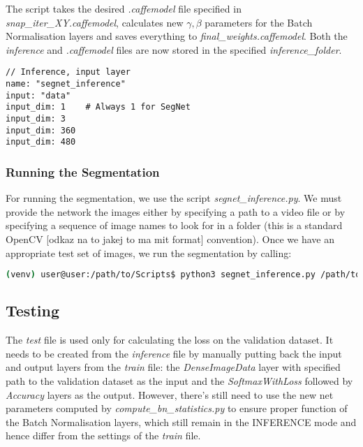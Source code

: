 The script takes the desired \textit{.caffemodel} file specified in \textit{snap\_iter\_XY.caffemodel}, calculates new $ \gamma, \beta $ parameters for the Batch Normalisation layers and saves everything to \textit{final\_weights.caffemodel}. Both the \textit{inference} and \textit{.caffemodel} files are now stored in the specified \textit{inference\_folder}.

\begin{lstlisting}
// Inference, input layer
name: "segnet_inference"
input: "data"
input_dim: 1	# Always 1 for SegNet
input_dim: 3
input_dim: 360
input_dim: 480
\end{lstlisting}

\subsubsection{Running the Segmentation}

For running the segmentation, we use the script \textit{segnet\_inference.py}. We must provide the network the images either by specifying a path to a video file or by specifying a sequence of image names to look for in a folder (this is a standard OpenCV [odkaz na to jakej to ma mit format] convention). Once we have an appropriate test set of images, we run the segmentation by calling:

\begin{lstlisting}[language=bash]
(venv) user@user:/path/to/Scripts$ python3 segnet_inference.py /path/to/inference.prototxt /path/to/final_weights.caffemodel /path/to/videofile.avi 
\end{lstlisting}

\subsection{Testing}

The \textit{test} file is used only for calculating the loss on the validation dataset. It needs to be created from the \textit{inference} file by manually putting back the input and output layers from the \textit{train} file: the \textit{DenseImageData} layer with specified path to the validation dataset as the input and the \textit{SoftmaxWithLoss} followed by \textit{Accuracy} layers as the output. However, there's still need to use the new net parameters computed by \textit{compute\_bn\_statistics.py} to ensure proper function of the Batch Normalisation layers, which still remain in the INFERENCE mode and hence differ from the settings of the \textit{train} file.

